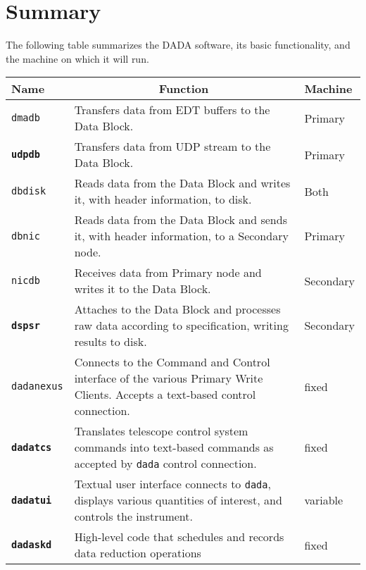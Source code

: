 \chapter{Summary}

The following table summarizes the DADA software, its basic
functionality, and the machine on which it will run.

\vspace{5mm}

\begin{tabular}{l|p{8cm}|l}

Name & \multicolumn{1}{c}{Function} & Machine \\ \hline

{\tt dmadb} & Transfers data from EDT buffers to the Data Block.
	& Primary \\

{\bf\tt udpdb} & Transfers data from UDP stream to the Data Block.
	& Primary \\

{\tt dbdisk} & Reads data from the Data Block and writes it, with
	header information, to disk. & Both \\

{\tt dbnic} & Reads data from the Data Block and sends it, with
	header information, to a Secondary node. & Primary \\

{\tt nicdb} & Receives data from Primary node and writes it to the 
	Data Block. & Secondary \\

{\bf\tt dspsr} & Attaches to the Data Block and processes raw data
	according to specification, writing results to disk. &
	Secondary \\

{\tt dadanexus} & Connects to the Command and Control interface of
	the various Primary Write Clients.  Accepts a text-based
	control connection.  & fixed \\

{\bf\tt dadatcs} & Translates telescope control system commands into
	text-based commands as accepted by {\tt dada} control
	connection. & fixed \\

{\bf\tt dadatui} & Textual user interface connects to {\tt dada},
	displays various quantities of interest, and controls
	the instrument. & variable \\

{\bf\tt dadaskd} & High-level code that schedules and records
        data reduction operations & fixed \\

\end{tabular}

